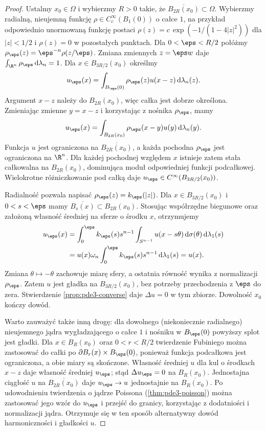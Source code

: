 \begin{proof}
Ustalmy $x_0\in\Omega$ i wybierzmy $R>0$ takie,
że $\overline{B_{2R}(x_0)}\subset\Omega$.
Wybierzmy radialną, nieujemną funkcję
$\rho\in C_c^\infty(B_1(0))$ o całce $1$,
na przykład odpowiednio unormowaną funkcję postaci
$\rho(z)=c\,\exp(-1/(1-4|z|^2))$ dla $|z|<1/2$
i $\rho(z)=0$ w pozostałych punktach.
Dla $0<\eps<R/2$ połóżmy
$\rho_\eps(z)=\eps^{-n}\rho(z/\eps)$.
Zmiana zmiennych $z=\eps w$ daje
$\int_{\R^n}\rho_\eps\,\mathrm d\lambda_n=1$.
Dla $x\in B_{3R/2}(x_0)$ określmy
\[
 u_\eps(x)=\int_{B_\eps(0)}\rho_\eps(z)u(x-z)\,
 \mathrm d\lambda_n(z).
\]
Argument $x-z$ należy do $B_{2R}(x_0)$,
więc całka jest dobrze określona. Zmieniając zmienne
$y=x-z$ i korzystając z nośnika $\rho_\eps$, mamy
\[
 u_\eps(x)=\int_{B_{2R}(x_0)}\rho_\eps(x-y)u(y)\,
 \mathrm d\lambda_n(y).
\]
Funkcja $u$ jest ograniczona na $\overline{B_{2R}(x_0)}$,
a każda pochodna $\rho_\eps$ jest ograniczona na $\R^n$.
Dla każdej pochodnej względem $x$ istnieje zatem
stała całkowalna na $B_{2R}(x_0)$, dominująca moduł
odpowiedniej funkcji podcałkowej.
Wielokrotne różniczkowanie pod całką daje
$u_\eps\in C^\infty(B_{3R/2}(x_0))$.

Radialność pozwala napisać $\rho_\eps(z)=k_\eps(|z|)$.
Dla $x\in B_{3R/2}(x_0)$ i $0<s<\eps$ mamy
$\overline{B_s(x)}\subset B_{2R}(x_0)$.
Stosując współrzędne biegunowe oraz założoną własność
średniej na sferze o środku $x$, otrzymujemy
\[
 \begin{aligned}
 u_\eps(x)
 &=\int_0^\eps k_\eps(s)s^{n-1}
       \int_{S^{n-1}}u(x-s\theta)\,\mathrm d\sigma(\theta)
       \,\mathrm d\lambda_1(s)\\
 &=u(x)\omega_n\int_0^\eps k_\eps(s)s^{n-1}
       \,\mathrm d\lambda_1(s)
 =u(x).
 \end{aligned}
\]
Zmiana $\theta\mapsto-\theta$ zachowuje miarę sfery,
a ostatnia równość wynika z normalizacji $\rho_\eps$.
Zatem $u$ jest gładka na $B_{3R/2}(x_0)$, bez potrzeby
przechodzenia z $\eps$ do zera. Stwierdzenie
\ref{prop:pde3-converse} daje $\Delta u=0$ w tym zbiorze.
Dowolność $x_0$ kończy dowód.

Warto zauważyć także inną drogę: dla dowolnego (niekoniecznie
radialnego) nieujemnego jądra wygładzającego o całce $1$
i nośniku w $B_\eps(0)$ powyższy splot jest gładki.
Dla $x\in B_R(x_0)$ oraz $0<r<R/2$ twierdzenie Fubiniego
można zastosować do całki po $\partial B_r(x)\times B_\eps(0)$,
ponieważ funkcja podcałkowa jest ograniczona, a obie miary
są skończone. Własność średniej $u$ dla kul o środkach
$x-z$ daje własność średniej $u_\eps$; stąd
$\Delta u_\eps=0$ na $B_R(x_0)$. Jednostajna ciągłość
$u$ na $\overline{B_{2R}(x_0)}$ daje
$u_\eps\to u$ jednostajnie na $\overline{B_R(x_0)}$.
Po udowodnieniu twierdzenia o jądrze Poissona
(\ref{thm:pde3-poisson}) można zastosować jego wzór
do $u_\eps$ i przejść do granicy, korzystając z dodatniości
i normalizacji jądra. Otrzymuje się w ten sposób
alternatywny dowód harmoniczności i gładkości $u$.
\end{proof}

